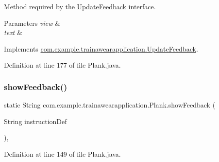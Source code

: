 Method required by the \mbox{\hyperlink{interfacecom_1_1example_1_1trainawearapplication_1_1_update_feedback}{Update\+Feedback}} interface. 


\begin{DoxyParams}{Parameters}
{\em view} & \\
\hline
{\em text} & \\
\hline
\end{DoxyParams}


Implements \mbox{\hyperlink{interfacecom_1_1example_1_1trainawearapplication_1_1_update_feedback_a7a026880188b11aca6d8184d57e699e8}{com.\+example.\+trainawearapplication.\+Update\+Feedback}}.



Definition at line 177 of file Plank.\+java.


\begin{DoxyCode}{0}

\end{DoxyCode}
\mbox{\label{classcom_1_1example_1_1trainawearapplication_1_1_plank_a14343873d9ff489757bebbad97adbaf1}} 
\subsubsection{\texorpdfstring{showFeedback()}{showFeedback()}}
{\footnotesize\ttfamily static String com.\+example.\+trainawearapplication.\+Plank.\+show\+Feedback (\begin{DoxyParamCaption}\item[{String}]{instruction\+Def }\end{DoxyParamCaption})\hspace{0.3cm}{\ttfamily [inline]}, {\ttfamily [static]}}



Definition at line 149 of file Plank.\+java.


